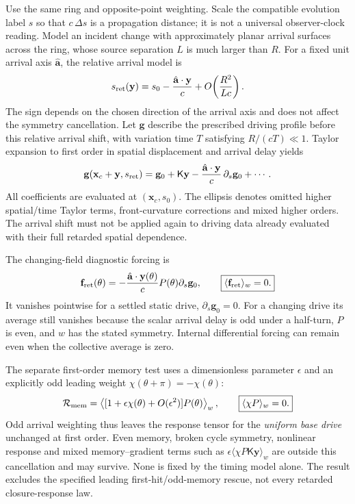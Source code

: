 \documentclass[11pt]{article}
\newcommand{\cmc}{c}
\theoremstyle{plain}
\theoremstyle{remark}
\begin{document}
Use the same ring and opposite-point weighting.  Scale the compatible
evolution label $s$ so that $\cmc\,\Delta s$ is a propagation distance;
it is not a universal observer-clock reading.  Model an incident change
with approximately planar arrival surfaces across the ring, whose
source separation $L$ is much larger than $R$.  For a fixed unit
arrival axis $\hat{\mathbf a}$, the relative arrival model is
\begin{equation}
 s_{\rm ret}(\mathbf y)
 =s_0-\frac{\hat{\mathbf a}\cdot\mathbf y}{\cmc}
   +O\!\left(\frac{R^2}{L\cmc}\right).
 \label{eq:diag-arrival-time}
\end{equation}
The sign depends on the chosen direction of the arrival axis and does
not affect the symmetry cancellation.  Let $\mathbf g$ describe the
prescribed driving profile before this relative arrival shift, with
variation time $T$ satisfying $R/(\cmc T)\ll1$.  Taylor expansion to
first order in spatial displacement and arrival delay yields
\begin{equation}
 \mathbf g(\mathbf x_c+\mathbf y,s_{\rm ret})
 =\mathbf g_0+\mathsf K\mathbf y
  -\frac{\hat{\mathbf a}\cdot\mathbf y}{\cmc}\,
    \partial_s\mathbf g_0+\cdots .
 \label{eq:diag-arrival-expansion}
\end{equation}
All coefficients are evaluated at $(\mathbf x_c,s_0)$.
The ellipsis denotes omitted higher spatial/time Taylor terms, front-curvature
corrections and mixed higher orders.  The arrival shift must not be
applied again to driving data already evaluated with their full
retarded spatial dependence.

The changing-field diagnostic forcing is
\begin{equation}
 \mathbf f_{\rm ret}(\theta)
 =-\frac{\hat{\mathbf a}\cdot\mathbf y(\theta)}{\cmc}
    P(\theta)\partial_s\mathbf g_0,\qquad
 \boxed{\langle\mathbf f_{\rm ret}\rangle_w=0.}
 \label{eq:diag-retarded-zero}
\end{equation}
It vanishes pointwise for a settled static drive,
$\partial_s\mathbf g_0=0$.  For a changing drive its average still
vanishes because the scalar arrival delay is odd under a half-turn,
$P$ is even, and $w$ has the stated symmetry.  Internal differential
forcing can remain even when the collective average is zero.

The separate first-order memory test uses a dimensionless parameter
$\epsilon$ and an explicitly odd leading weight
$\chi(\theta+\pi)=-\chi(\theta)$:
\begin{equation}
 \mathcal R_{\rm mem}
 =\left\langle[1+\epsilon\chi(\theta)+O(\epsilon^2)]P(\theta)
   \right\rangle_w,\qquad
 \boxed{\langle\chi P\rangle_w=0.}
 \label{eq:diag-odd-memory-zero}
\end{equation}
Odd arrival weighting thus leaves the response tensor for the
\emph{uniform base drive} unchanged at first order.  Even memory,
broken cycle symmetry, nonlinear response and mixed memory--gradient
terms such as $\epsilon\langle\chi P\mathsf K\mathbf y\rangle_w$
are outside this cancellation and may survive.  None is fixed by the
timing model alone.  The result excludes the specified leading
first-hit/odd-memory rescue, not every retarded closure-response law.




\newpage
\printbibliography
\end{document}

